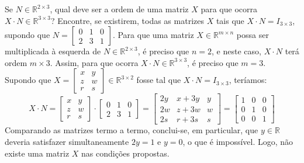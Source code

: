 \documentclass[12pt,a4paper]{article}
\newcommand*\R{\mathbb{R}}
\begin{document}
\begin{ExerciseList}
\Exercise[title={2,0}] Se $N \in \R^{2 \times 3}$, qual deve ser a ordem de uma matriz $X$ para que ocorra $X\cdot N \in \R^{3 \times 3}$?  Encontre, se existirem, todas as matrizes $X$ tais que $X \cdot N = I_{3\times 3}$, supondo que $N = \begin{bmatrix}
0 & 1 & 0 \\
2 & 3 & 1
\end{bmatrix}$.
\Answer Para que uma matriz $X \in \R^{m \times n}$ possa ser multiplicada à esquerda de $N \in \R^{2 \times 3}$, é preciso que $n = 2$, e neste caso, $X \cdot N$ terá ordem $m \times 3$. Assim, para que ocorra $X\cdot N \in \R^{3 \times 3}$, é preciso que $m=3$. Supondo que $
X = \begin{bmatrix}
x & y \\ z & w \\ r & s
\end{bmatrix}
\in \R^{3 \times 2}$
fosse tal que $X \cdot N = I_{3\times 3}$, teríamos:
\[
X \cdot N
= \begin{bmatrix}
x & y \\ z & w \\ r & s
\end{bmatrix}
\cdot
\begin{bmatrix}
0 & 1 & 0 \\
2 & 3 & 1
\end{bmatrix}
=
\begin{bmatrix}
2y & x+3y & y \\
2w & z+3w & w \\
2s & r+3s & s
\end{bmatrix}
=
\begin{bmatrix}
1 & 0 & 0 \\
0 & 1 & 0 \\
0 & 0 & 1
\end{bmatrix}
\]
Comparando as matrizes termo a termo, conclui-se, em particular, que $y \in \R$ deveria satisfazer simultaneamente $2y = 1$ e $y=0$, o que é impossível. Logo, não existe uma matriz $X$ nas condições propostas.


\end{ExerciseList}
\end{document}
